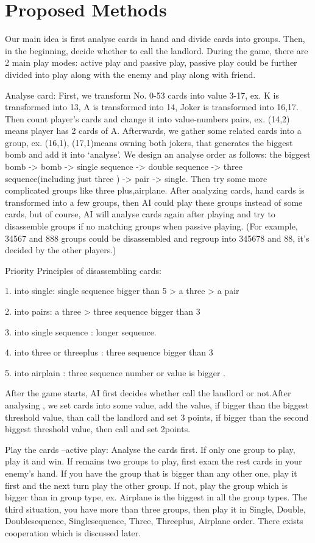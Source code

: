 \documentclass[a4paper,man,natbib]{apa6}
\begin{document}
\section{Proposed Methods}
Our main idea is first analyse cards in hand and divide cards into groups. Then, in the beginning, decide whether to call the landlord. During the game, there are 2 main play modes: active play and passive play, passive play could be further divided into play along with the enemy and play along with friend. 

Analyse card: First, we transform No. 0-53 cards into value 3-17, ex. K is transformed into 13, A is transformed into 14, Joker is transformed into 16,17. Then count player’s cards and change it into value-numbers pairs, ex. (14,2) means player has 2 cards of A. Afterwards, we gather some related cards into a group, ex. (16,1), (17,1)means owning both jokers, that generates the biggest bomb and add it into ‘analyse’. We design an analyse order as follows: the biggest bomb -> bomb -> single sequence -> double sequence -> three sequence(including just three ) -> pair -> single.  Then try some more complicated groups like three plus,airplane. After analyzing cards, hand cards is transformed into a few groups, then AI could play these groups instead of some cards, but of course, AI will analyse cards again after playing and try to disassemble groups if no matching groups when passive playing. (For example, 34567 and 888 groups could be disassembled and regroup into 345678 and 88, it’s decided by the other players.)

Priority Principles of disassembling cards:

1. into single: single sequence bigger than 5 > a three > a pair

2. into pairs: a three > three sequence bigger than 3

3. into single sequence : longer sequence.

4. into three or threeplus : three sequence bigger than 3

5. into airplain : three sequence number or value is bigger .

After the game starts, AI first decides whether call the landlord or not.After analysing , we set cards into some value, add the value, if bigger than the biggest threshold value, than call the landlord and set 3 points, if bigger than the second biggest threshold value, then call and set 2points.

Play the cards –active play: Analyse the cards first. If only one group to play, play it and win. If remains two groups to play, first exam the rest cards in your enemy’s hand. If you have the group that  is bigger than any other one, play it first and the next turn play the other group. If not, play the group which is bigger than in group type, ex. Airplane is the biggest in all the group types. The third situation, you have more than three groups, then play it in Single, Double, Doublesequence, Singlesequence, Three, Threeplus, Airplane order. There exists cooperation which is discussed later.
\end{document}
